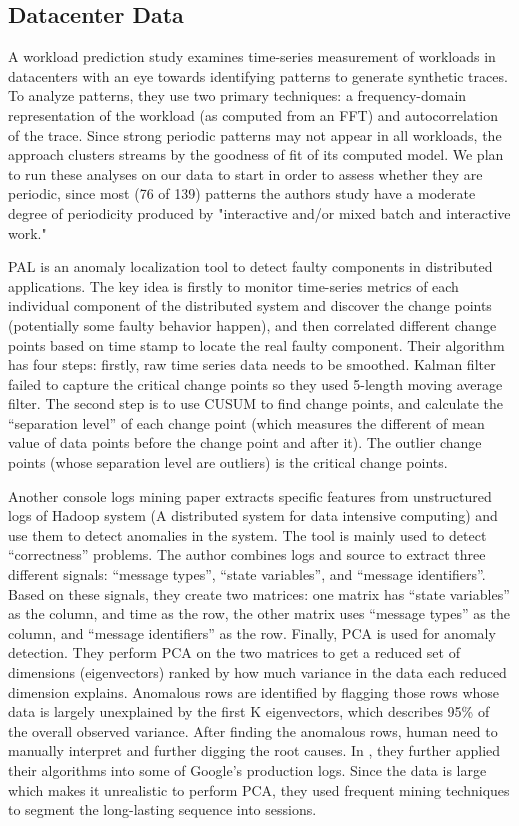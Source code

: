 \subsection{Datacenter Data}
A workload prediction study \cite{Gmach2007} examines time-series measurement of workloads in datacenters with an eye towards identifying patterns to generate synthetic traces. To analyze patterns, they use two primary techniques: a frequency-domain representation of the workload (as computed from an FFT) and autocorrelation of the trace. Since strong periodic patterns may not appear in all workloads, the approach clusters streams by the goodness of fit of its computed model. We plan to run these analyses on our data to start in order to assess whether they are periodic, since most (76 of 139) patterns the authors study have a moderate degree of periodicity produced by "interactive and/or mixed batch and interactive work."

PAL is an anomaly localization tool to detect faulty components in distributed applications. The key idea is firstly to monitor time-series metrics of each individual component of the distributed system and discover the change points (potentially some faulty behavior happen), and then correlated different change points based on time stamp to locate the real faulty component. Their algorithm has four steps: firstly, raw time series data needs to be smoothed. Kalman filter failed to capture the critical change points so they used 5-length moving average filter. The second step is to use CUSUM to find change points, and calculate the “separation level” of each change point (which measures the different of mean value of data points before the change point and after it). The outlier change points (whose separation level are outliers) is the critical change points.

Another console logs mining paper \cite{xu2009} extracts specific features from unstructured logs of Hadoop system \cite{Hadoop} (A distributed system for data intensive computing) and use them to detect anomalies in the system. The tool is mainly used to detect “correctness” problems. The author combines logs and source to extract three different signals: “message types”, “state variables”, and “message identifiers”. Based on these signals, they create two matrices: one matrix has “state variables” as the column, and time as the row, the other matrix uses “message types” as the column, and “message identifiers” as the row. Finally, PCA is used for anomaly detection. They perform PCA on the two matrices to get a reduced set of dimensions (eigenvectors) ranked by how much variance in the data each reduced dimension explains. Anomalous rows are identified by flagging those rows whose data is largely unexplained by the first K eigenvectors, which describes 95\% of the overall observed variance. 
After finding the anomalous rows, human need to manually interpret and further digging the root causes. In \cite{xu2010}, they further applied their algorithms into some of Google’s production logs. Since the data is large which makes it unrealistic to perform PCA, they used frequent mining techniques to segment the long-lasting sequence into sessions.

